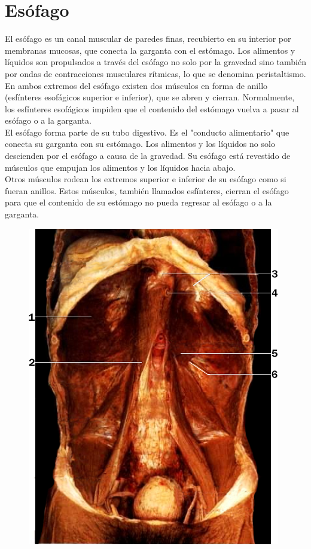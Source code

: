 \section{Esófago}
El esófago es un canal muscular de paredes finas, recubierto en su interior por membranas mucosas, que conecta la garganta con el estómago. Los alimentos 
y líquidos son propulsados a través del esófago no solo por la gravedad sino también por ondas de contracciones musculares rítmicas, lo que se denomina peristaltismo. 
En ambos extremos del esófago existen dos músculos en forma de anillo (esfínteres esofágicos superior e inferior), que se abren y cierran. Normalmente, los esfínteres 
esofágicos impiden que el contenido del estómago vuelva a pasar al esófago o a la garganta.\\
El esófago forma parte de su tubo digestivo. Es el "conducto alimentario" que conecta su garganta con su estómago. Los alimentos y los líquidos no solo descienden por 
el esófago a causa de la gravedad. Su esófago está revestido de músculos que empujan los alimentos y los líquidos hacia abajo.\\
Otros músculos rodean los extremos superior e inferior de su esófago como si fueran anillos. Estos músculos, también llamados esfínteres, cierran el esófago para que 
el contenido de su estómago no pueda regresar al esófago o a la garganta.\\
\begin{figure}[H]
	\begin{center}
 		\includegraphics[width = .7\textwidth]{v2/images/image39.png}
	\end{center} 
\end{figure}

